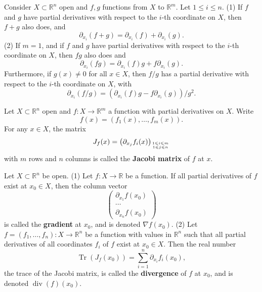 \documentclass[10pt,landscape, a4paper]{article}
\newcommand{\custombox}[3]{\begin{tcolorbox}[left=0mm,right=0mm,bottom=0mm,top=0mm,title = \textbf{#1}, colback=#2!10!white, colframe = #2!70!white, coltitle=white, breakable]
    #3
    \end{tcolorbox}}
\newcommand{\definition}[2]{\custombox{Definition #1}{red}{#2}}
\newcommand{\prop}[2]{\custombox{Proposition #1}{black!50!orange!30!yellow}{#2}}
\newcommand{\R}{\mathbb{R}}
\newcommand{\Rn}{\R^n}
\newcommand{\Rm}{\R^m}
\begin{document}
\begin{multicols*}{3}
    \prop{3.3.7.}{Consider $X \subset \Rn$ open and $f, g$ functions from $X$ to $\Rm$. Let $1 \leqslant i \leqslant n$.
        (1) If $f$ and $g$ have partial derivatives with respect to the $i$-th coordinate on $X$, then $f+g$ also does, and
        $$
            \partial_{x_{i}}(f+g)=\partial_{x_{i}}(f)+\partial_{x_{i}}(g) .
        $$
        (2) If $m=1$, and if $f$ and $g$ have partial derivatives with respect to the $i$-th coordinate on $X$, then $f g$ also does and
        $$
            \partial_{x_{i}}(f g)=\partial_{x_{i}}(f) g+f \partial_{x_{i}}(g) .
        $$
        Furthermore, if $g(x) \neq 0$ for all $x \in X$, then $f / g$ has a partial derivative with respect to the $i$-th coordinate on $X$, with
        $$
            \partial_{x_{i}}(f / g)=\left(\partial_{x_{i}}(f) g-f \partial_{x_{i}}(g)\right) / g^{2} .
        $$}

    \definition{3.3.9. (Jacobi matrix)}{Let $X \subset \Rn$ open and $f: X \rightarrow \Rm$ a function with partial derivatives on $X$. Write
        $$
            f(x)=\left(f_{1}(x), \ldots, f_{m}(x)\right) .
        $$
        For any $x \in X$, the matrix
        $$
            J_{f}(x)=\left(\partial_{x_{j}} f_{i}(x)\right)_{1 \leqslant i \leqslant m \atop 1 \leqslant j \leqslant n}
        $$
        with $m$ rows and $n$ columns is called the \textbf{Jacobi matrix} of $f$ at $x$.}

    \definition{3.3.11 (Gradient, Divergence)}{Let $X \subset \Rn$ be open.
        (1) Let $f: X \rightarrow \R$ be a function. If all partial derivatives of $f$ exist at $x_{0} \in X$, then the column vector
        $$
            \left(\begin{array}{c}
                    \partial_{x_{1}} f\left(x_{0}\right) \\
                    \cdots                               \\
                    \partial_{x_{n}} f\left(x_{0}\right)
                \end{array}\right)
        $$
        is called the \textbf{gradient} at $x_{0}$, and is denoted $\nabla f\left(x_{0}\right)$.
        (2) Let $f=\left(f_{1}, \ldots, f_{n}\right): X \rightarrow \Rn$ be a function with values in $\Rn$ such that all partial derivatives of all coordinates $f_{i}$ of $f$ exist at $x_{0} \in X$. Then the real number
        $$
            \operatorname{Tr}\left(J_{f}\left(x_{0}\right)\right)=\sum_{i=1}^{n} \partial_{x_{i}} f_{i}\left(x_{0}\right),
        $$
        the trace of the Jacobi matrix, is called the \textbf{divergence} of $f$ at $x_{0}$, and is denoted $\operatorname{div}(f)\left(x_{0}\right)$.}


\end{multicols*}
\end{document}
